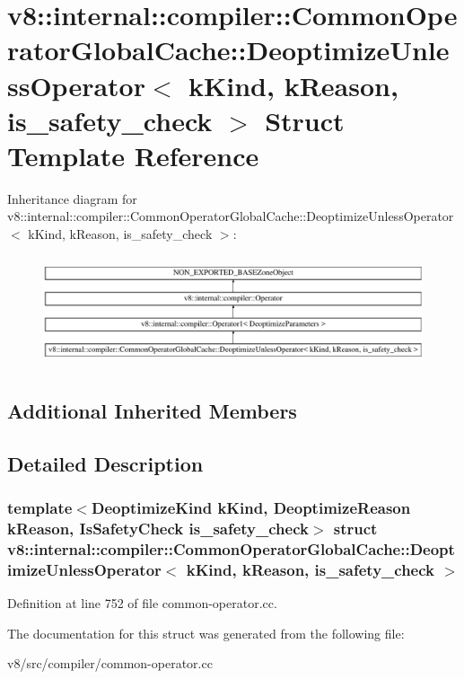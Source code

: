 \hypertarget{structv8_1_1internal_1_1compiler_1_1CommonOperatorGlobalCache_1_1DeoptimizeUnlessOperator}{}\section{v8\+:\+:internal\+:\+:compiler\+:\+:Common\+Operator\+Global\+Cache\+:\+:Deoptimize\+Unless\+Operator$<$ k\+Kind, k\+Reason, is\+\_\+safety\+\_\+check $>$ Struct Template Reference}
\label{structv8_1_1internal_1_1compiler_1_1CommonOperatorGlobalCache_1_1DeoptimizeUnlessOperator}
Inheritance diagram for v8\+:\+:internal\+:\+:compiler\+:\+:Common\+Operator\+Global\+Cache\+:\+:Deoptimize\+Unless\+Operator$<$ k\+Kind, k\+Reason, is\+\_\+safety\+\_\+check $>$\+:\begin{figure}[H]
\begin{center}
\leavevmode
\includegraphics[height=3.289281cm]{structv8_1_1internal_1_1compiler_1_1CommonOperatorGlobalCache_1_1DeoptimizeUnlessOperator}
\end{center}
\end{figure}
\subsection*{Additional Inherited Members}


\subsection{Detailed Description}
\subsubsection*{template$<$Deoptimize\+Kind k\+Kind, Deoptimize\+Reason k\+Reason, Is\+Safety\+Check is\+\_\+safety\+\_\+check$>$\newline
struct v8\+::internal\+::compiler\+::\+Common\+Operator\+Global\+Cache\+::\+Deoptimize\+Unless\+Operator$<$ k\+Kind, k\+Reason, is\+\_\+safety\+\_\+check $>$}



Definition at line 752 of file common-\/operator.\+cc.



The documentation for this struct was generated from the following file\+:\begin{DoxyCompactItemize}
\item 
v8/src/compiler/common-\/operator.\+cc\end{DoxyCompactItemize}
